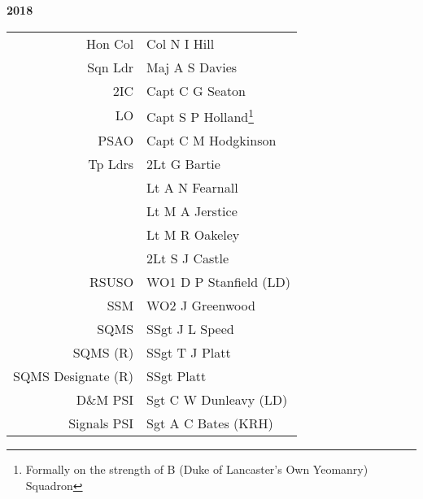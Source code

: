 
\begin{center}
  \Huge
  \textbf{2018}
\end{center}

\begin{center}
  \small
  \begin{tabular}{rl}
    Hon Col & Col N I Hill \\
    Sqn Ldr & Maj A S Davies \\
    2IC & Capt C G Seaton \\
    LO & Capt S P Holland\footnote{Formally on the strength of B (Duke of Lancaster's Own Yeomanry) Squadron} \\
    PSAO & Capt C M Hodgkinson \\
    Tp Ldrs & 2Lt G Bartie \\
     & Lt A N Fearnall \\
     & Lt M A Jerstice \\
     & Lt M R Oakeley \\
     & 2Lt S J Castle \\
    RSUSO & WO1 D P Stanfield (LD) \\
    SSM & WO2 J Greenwood \\
    SQMS & SSgt J L Speed \\
    SQMS (R) & SSgt T J Platt \\
    SQMS Designate (R) & SSgt Platt \\
    D\&M PSI & Sgt C W Dunleavy (LD) \\
    Signals PSI & Sgt A C Bates (KRH) \\
  \end{tabular}
\end{center}

